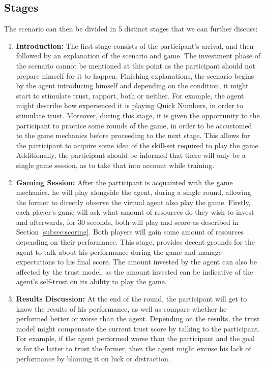 \subsection{Stages}
\label{sub:stages}
The scenario can then be divided in 5 distinct stages that we can further discuss:
\begin{enumerate}[label=\textbf{\arabic*.}]
    \item \textbf{Introduction:} The first stage consists of the participant's arrival, and then followed by an explanation of the scenario and game. The investment phase of the scenario cannot be mentioned at this point as the participant should not prepare himself for it to happen. Finishing explanations, the scenario begins by the agent introducing himself and depending on the condition, it might start to stimulate trust, rapport, both or neither. For example, the agent might describe how experienced it is playing Quick Numbers, in order to stimulate trust. Moreover, during this stage, it is given the opportunity to the participant to practice some rounds of the game, in order to be accustomed to the game mechanics before proceeding to the next stage. This allows for the participant to acquire some idea of the skill-set required to play the game. Additionally, the participant should be informed that there will only be a single game session, as to take that into account while training.
    
    \item \textbf{Gaming Session:} After the participant is acquainted with the game mechanics, he will play alongside the agent, during a single round, allowing the former to directly observe the virtual agent also play the game. Firstly, each player's game will ask what amount of resources do they wish to invest and afterwards, for 30 seconds, both will play and score as described in Section \ref{subsec:scoring}. Both players will gain some amount of resources depending on their performance. This stage, provides decent grounds for the agent to talk about his performance during the game and manage expectations to his final score. The amount invested by the agent can also be affected by the trust model, as the amount invested can be indicative of the agent's self-trust on its ability to play the game.
    
    \item \textbf{Results Discussion:} At the end of the round, the participant will get to know the results of his performance, as well as compare whether he performed better or worse than the agent. Depending on the results, the trust model might compensate the current trust score by talking to the participant. For example, if the agent performed worse than the participant and the goal is for the latter to trust the former, then the agent might excuse his lack of performance by blaming it on luck or distraction. 
    

\end{enumerate}
